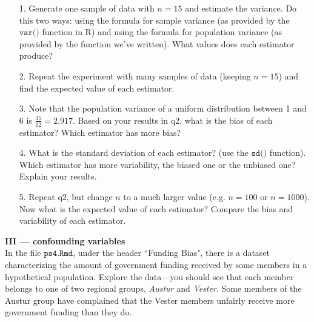 \documentclass[10pt]{extarticle}
\begin{document}
\begin{itemize}

    \item[1.] Generate one sample of data with $n=15$ and estimate the variance. Do this two ways: using the formula for sample variance (as provided by the $\texttt{var()}$ function in R) and using the formula for population variance (as provided by the function we've written). What values does each estimator produce? \\ 
    
    \item[2.] Repeat the experiment with many samples of data (keeping $n=15$) and find the expected value of each estimator. \\ 
    \item[3.] Note that the population variance of a uniform distribution between 1 and 6 is $\frac{35}{12} = 2.917$. Based on your results in q2, what is the bias of each estimator? Which estimator has more bias? \\ 
    
    \item[4.] What is the standard deviation of each estimator? (use the $\texttt{sd()}$ function). Which estimator has more variability, the biased one or the unbiased one? Explain your results. \\ 
    
    \item[5.] Repeat q2, but change $n$ to a much larger value (e.g. $n=100$ or $n=1000$). Now what is the expected value of each estimator? Compare the bias and variability of each estimator. 
    
\end{itemize}




\hfill 

{\Large \bf III --- confounding variables}  \\

In the file $\texttt{ps4.Rmd}$, under the header ``Funding Bias", there is a dataset characterizing the amount of government funding received by some members in a hypothetical population. Explore the data---you should see that each member belongs to one of two regional groups, {\it Austur} and {\it Vester}. Some members of the Austur group have complained that the Vester members unfairly receive more government funding than they do. \\ 
\end{document}
